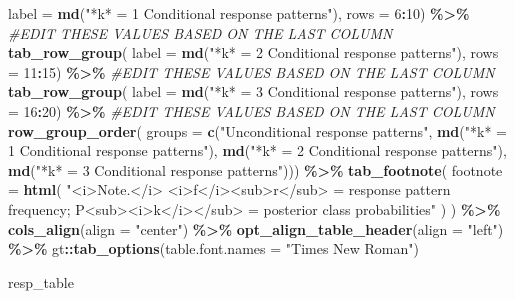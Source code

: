 \documentclass[
]{book}
\newenvironment{Shaded}{\begin{snugshade}}{\end{snugshade}}
\newcommand{\AttributeTok}[1]{\textcolor[rgb]{0.13,0.29,0.53}{#1}}
\newcommand{\CommentTok}[1]{\textcolor[rgb]{0.56,0.35,0.01}{\textit{#1}}}
\newcommand{\DecValTok}[1]{\textcolor[rgb]{0.00,0.00,0.81}{#1}}
\newcommand{\FunctionTok}[1]{\textcolor[rgb]{0.13,0.29,0.53}{\textbf{#1}}}
\newcommand{\NormalTok}[1]{#1}
\newcommand{\SpecialCharTok}[1]{\textcolor[rgb]{0.81,0.36,0.00}{\textbf{#1}}}
\newcommand{\StringTok}[1]{\textcolor[rgb]{0.31,0.60,0.02}{#1}}
\begin{document}
\begin{Shaded}
\begin{Highlighting}[]
    \AttributeTok{label =} \FunctionTok{md}\NormalTok{(}\StringTok{"*k* = 1 Conditional response patterns"}\NormalTok{),}
    \AttributeTok{rows =} \DecValTok{6}\SpecialCharTok{:}\DecValTok{10}\NormalTok{) }\SpecialCharTok{\%\textgreater{}\%} \CommentTok{\#EDIT THESE VALUES BASED ON THE LAST COLUMN}
  \FunctionTok{tab\_row\_group}\NormalTok{(}
    \AttributeTok{label =} \FunctionTok{md}\NormalTok{(}\StringTok{"*k* = 2 Conditional response patterns"}\NormalTok{),}
    \AttributeTok{rows =} \DecValTok{11}\SpecialCharTok{:}\DecValTok{15}\NormalTok{)  }\SpecialCharTok{\%\textgreater{}\%} \CommentTok{\#EDIT THESE VALUES BASED ON THE LAST COLUMN}
  \FunctionTok{tab\_row\_group}\NormalTok{(}
    \AttributeTok{label =} \FunctionTok{md}\NormalTok{(}\StringTok{"*k* = 3 Conditional response patterns"}\NormalTok{),}
    \AttributeTok{rows =} \DecValTok{16}\SpecialCharTok{:}\DecValTok{20}\NormalTok{)  }\SpecialCharTok{\%\textgreater{}\%} \CommentTok{\#EDIT THESE VALUES BASED ON THE LAST COLUMN  }
    \FunctionTok{row\_group\_order}\NormalTok{(}
      \AttributeTok{groups =} \FunctionTok{c}\NormalTok{(}\StringTok{"Unconditional response patterns"}\NormalTok{,}
                 \FunctionTok{md}\NormalTok{(}\StringTok{"*k* = 1 Conditional response patterns"}\NormalTok{),}
                 \FunctionTok{md}\NormalTok{(}\StringTok{"*k* = 2 Conditional response patterns"}\NormalTok{),}
                 \FunctionTok{md}\NormalTok{(}\StringTok{"*k* = 3 Conditional response patterns"}\NormalTok{))) }\SpecialCharTok{\%\textgreater{}\%} 
    \FunctionTok{tab\_footnote}\NormalTok{(}
    \AttributeTok{footnote =} \FunctionTok{html}\NormalTok{(}
      \StringTok{"\textless{}i\textgreater{}Note.\textless{}/i\textgreater{} \textless{}i\textgreater{}f\textless{}/i\textgreater{}\textless{}sub\textgreater{}r\textless{}/sub\textgreater{} = response pattern frequency; P\textless{}sub\textgreater{}\textless{}i\textgreater{}k\textless{}/i\textgreater{}\textless{}/sub\textgreater{} = posterior class probabilities"}
\NormalTok{    )}
\NormalTok{  ) }\SpecialCharTok{\%\textgreater{}\%} 
  \FunctionTok{cols\_align}\NormalTok{(}\AttributeTok{align =} \StringTok{"center"}\NormalTok{) }\SpecialCharTok{\%\textgreater{}\%} 
  \FunctionTok{opt\_align\_table\_header}\NormalTok{(}\AttributeTok{align =} \StringTok{"left"}\NormalTok{) }\SpecialCharTok{\%\textgreater{}\%} 
\NormalTok{  gt}\SpecialCharTok{::}\FunctionTok{tab\_options}\NormalTok{(}\AttributeTok{table.font.names =} \StringTok{"Times New Roman"}\NormalTok{)}

\NormalTok{resp\_table}
\end{Highlighting}
\end{Shaded}
\end{document}
